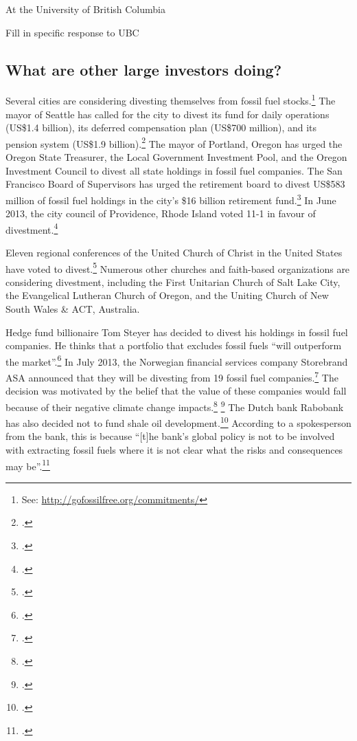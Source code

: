 At the University of British Columbia

\begin{vcom}
	Fill in specific response to UBC
\end{vcom}



	\subsection{What are other large investors doing?}
	\label{LargeInvestors}



Several cities are considering divesting themselves from fossil fuel stocks.\footnote{See: \url{http://gofossilfree.org/commitments/}}
The mayor of Seattle has called for the city to divest its fund for daily operations (US\$1.4 billion), its deferred compensation plan (US\$700 million), and its pension system (US\$1.9 billion).\footcite[][]{SeattleDivest}
The mayor of Portland, Oregon has urged the Oregon State Treasurer, the Local Government Investment Pool, and the Oregon Investment Council to divest all state holdings in fossil fuel companies.
The San Francisco Board of Supervisors has urged the retirement board to divest US\$583 million of fossil fuel holdings in the city's \$16 billion retirement fund.\footcite[][]{DivestProtect40to60}
In June 2013, the city council of Providence, Rhode Island voted 11-1 in favour of divestment.\footcite[][]{ProvidenceDivest}



Eleven regional conferences of the United Church of Christ in the United States have voted to divest.\footcite[][]{ChurchesFFDivestment}
Numerous other churches and faith-based organizations are considering divestment, including the First Unitarian Church of Salt Lake City, the Evangelical Lutheran Church of Oregon, and the Uniting Church of New South Wales \& ACT, Australia.



Hedge fund billionaire Tom Steyer has decided to divest his holdings in fossil fuel companies.
He thinks that a portfolio that excludes fossil fuels ``will outperform the market''.\footcite[][]{SteyerMiddleburyLetter}
In July 2013, the Norwegian financial services company Storebrand ASA announced that they will be divesting from 19 fossil fuel companies.\footcite[][]{StorebrandPR}
The decision was motivated by the belief that the value of these companies would fall because of their negative climate change impacts.\footcite[][]{StorebrandNews} \footcite[See also: ][]{GristStorebrand}
The Dutch bank Rabobank has also decided not to fund shale oil development.\footcite[][]{RabobankRefuses}
According to a spokesperson from the bank, this is because ``[t]he bank's global policy is not to be involved with extracting fossil fuels where it is not clear what the risks and consequences may be''.\footcite[][]{RabobankNews}



